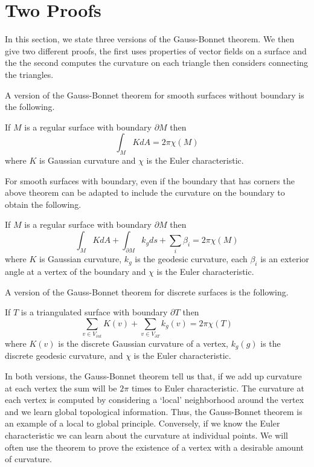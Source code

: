\section{Two Proofs}


In this section, we state three versions of the Gauss-Bonnet theorem.
We then give two different proofs, the first uses properties of vector fields
on a surface and the the second computes the curvature on each triangle
then considers connecting the triangles.


A version of the Gauss-Bonnet theorem for smooth surfaces without boundary is the following.

\begin{theorem} \label{thm:g-b-nb}

If $M$ is a regular surface with boundary $\partial M$ then
	$$\int_{M} K dA = 2\pi \chi(M)$$
	where  $K$ is Gaussian curvature and
	$\chi$ is the Euler characteristic.
\end{theorem}

For smooth surfaces with boundary, even if the boundary that has corners
the above theorem can be adapted to include the curvature on the boundary
to obtain the following.

\begin{theorem} \label{thm:g-b-c}

If $M$ is a regular surface with boundary $\partial M$ then
	$$\int_{M} K dA+ \int_{\partial M} k_g ds + \sum_i \beta_i= 2\pi \chi(M)$$
	where  $K$ is Gaussian curvature,
	 $k_g$ is the geodesic curvature,
	 each $\beta_i$  is an exterior angle at a vertex of the boundary and
	$\chi$ is the Euler characteristic.
\end{theorem}

A version of the Gauss-Bonnet theorem for discrete surfaces is the following.

\begin{theorem} \label{thm:g-b-d}

If $T$ is a triangulated surface with  boundary $\partial T$ then
$$\sum_{v\in V_{int}} K(v) + \sum_{v\in V_{\partial T}} k_g(v) = 2\pi \chi(T)$$
where $K(v)$ is the discrete Gaussian curvature
of a vertex, $k_g(g)$ is the discrete geodesic curvature,  and
$\chi$ is the Euler characteristic.
\end{theorem}

In both versions, the Gauss-Bonnet theorem tell us that, if we add up curvature
at each vertex the sum will be $2\pi$ times to Euler characteristic.
The curvature at each vertex is computed by considering a `local' neighborhood
around the vertex and we learn global topological information. Thus, the Gauss-Bonnet 
theorem is an example of a local to global principle. 
Conversely, if we know the Euler characteristic we can learn about the curvature
at individual points. We will often use the theorem to prove the existence of
a vertex with a desirable amount of curvature.

